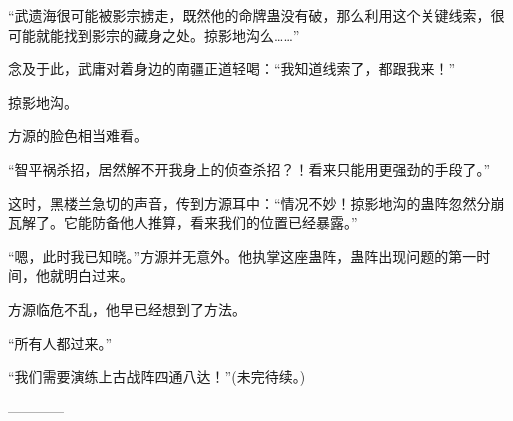 \begin{this_body}
“武遗海很可能被影宗掳走，既然他的命牌蛊没有破，那么利用这个关键线索，很可能就能找到影宗的藏身之处。掠影地沟么……”

念及于此，武庸对着身边的南疆正道轻喝：“我知道线索了，都跟我来！”

掠影地沟。

方源的脸色相当难看。

“智平祸杀招，居然解不开我身上的侦查杀招？！看来只能用更强劲的手段了。”

这时，黑楼兰急切的声音，传到方源耳中：“情况不妙！掠影地沟的蛊阵忽然分崩瓦解了。它能防备他人推算，看来我们的位置已经暴露。”

“嗯，此时我已知晓。”方源并无意外。他执掌这座蛊阵，蛊阵出现问题的第一时间，他就明白过来。

方源临危不乱，他早已经想到了方法。

“所有人都过来。”

“我们需要演练上古战阵四通八达！”(未完待续。)

------------

\end{this_body}

